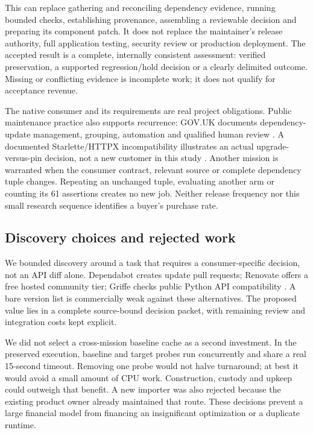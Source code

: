 \documentclass[11pt,a4paper]{article}
\begin{document}
This can replace gathering and reconciling dependency evidence, running bounded checks,
establishing provenance, assembling a reviewable decision and preparing its component patch.
It does not replace the maintainer's release authority, full application testing, security review
or production deployment. The accepted result is a complete, internally consistent assessment:
verified preservation, a supported regression/hold decision or a clearly delimited outcome.
Missing or conflicting evidence is incomplete work; it does not qualify for acceptance revenue.

The native consumer and its requirements are real project obligations. Public maintenance practice
also supports recurrence: GOV.UK documents dependency-update management, grouping, automation and
qualified human review \cite{govuk}. A documented Starlette/HTTPX incompatibility illustrates an
actual upgrade-versus-pin decision, not a new customer in this study \cite{starlette}.
Another mission is warranted when the consumer contract, relevant source or complete dependency
tuple changes. Repeating an unchanged tuple, evaluating another arm or counting its 61 assertions
creates no new job. Neither release frequency nor this small research sequence identifies a
buyer's purchase rate.

\subsection{Discovery choices and rejected work}
We bounded discovery around a task that requires a consumer-specific decision, not an API diff
alone. Dependabot creates update pull requests; Renovate offers a free hosted community tier; Griffe
checks public Python API compatibility \cite{dependabot,renovate,griffe}. A bare version list is
commercially weak against these alternatives. The proposed value lies in a complete source-bound
decision packet, with remaining review and integration costs kept explicit.

We did not select a cross-mission baseline cache as a second investment. In the preserved execution,
baseline and target probes run concurrently and share a real 15-second timeout. Removing one probe
would not halve turnaround; at best it would avoid a small amount of CPU work. Construction,
custody and upkeep could outweigh that benefit. A new importer was also rejected because the
existing product owner already maintained that route. These decisions prevent a large financial
model from financing an insignificant optimization or a duplicate runtime.
\end{document}
